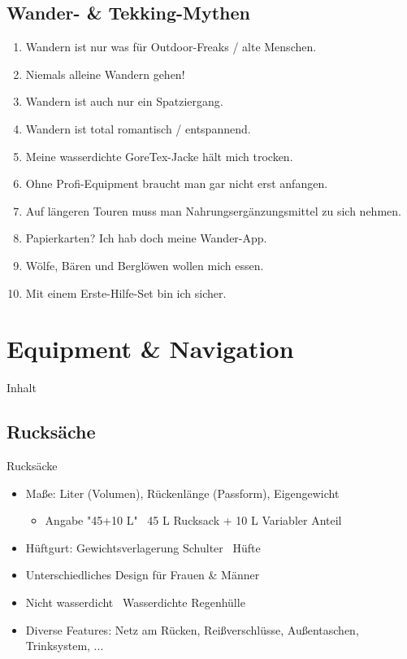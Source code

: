 \documentclass[aspectratio=169]{beamer}
\begin{document}
		\subsection{Wander- \& Tekking-Mythen}
			
			\begin{frame}{}
				\begin{enumerate}
					\item Wandern ist nur was für Outdoor-Freaks / alte Menschen.\pause
					\item Niemals alleine Wandern gehen!\pause
					\item Wandern ist auch nur ein Spatziergang.\pause
					\item Wandern ist total romantisch / entspannend.\pause
					\item Meine wasserdichte GoreTex-Jacke hält mich trocken.\pause
					\item Ohne Profi-Equipment braucht man gar nicht erst anfangen.\pause
					\item Auf längeren Touren muss man Nahrungsergänzungsmittel zu sich nehmen.\pause
					\item Papierkarten? Ich hab doch meine Wander-App.\pause
					\item Wölfe, Bären und Berglöwen wollen mich essen.\pause
					\item Mit einem Erste-Hilfe-Set bin ich sicher.
				\end{enumerate}
			\end{frame}
			
	\section{Equipment \& Navigation}
		
		\begin{frame}[t]{Inhalt}
		\end{frame}
		
		\subsection{Rucksäche}
		
			\begin{frame}{Rucksäcke}
				\begin{itemize}
					\item Maße: Liter (Volumen), Rückenlänge (Passform), Eigengewicht
					\begin{itemize}
						\item Angabe "45+10 L" \textrightarrow\ 45 L Rucksack + 10 L Variabler Anteil
					\end{itemize}\pause
					\item Hüftgurt: Gewichtsverlagerung Schulter \textrightarrow\ Hüfte\pause
					\item Unterschiedliches Design für Frauen \& Männer\pause
					\item Nicht wasserdicht \textrightarrow\ Wasserdichte Regenhülle\pause
					\item Diverse Features: Netz am Rücken, Reißverschlüsse, Außentaschen, Trinksystem, ...
				\end{itemize}
			\end{frame}
			
\end{document}
